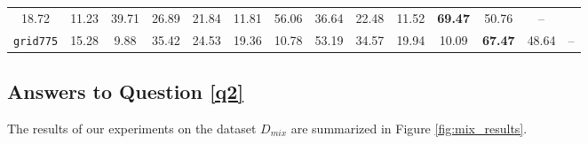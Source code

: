 \begin{table}[t]
\begin{adjustwidth}{-.5in}{-.5in}
\begin{center}
\begin{tabular}{|c|cccc|cccc|cccc|c|}
                18.72 & 11.23 & 39.71 & 26.89 &  %
                21.84 & 11.81 & 56.06 & 36.64 &  %
                22.48 & 11.52 & \textbf{69.47} & 50.76 &   %
                -- \\
                \texttt{grid775} &
                15.28 & 9.88 & 35.42 & 24.53 &  %
                19.36 & 10.78 & 53.19 & 34.57 &  %
                19.94 & 10.09 & \textbf{67.47} & 48.64 &   %
                -- \\
                \hline
            \end{tabular}
        \end{center}
    \end{adjustwidth}
    \vspace{-15pt}
\end{table}

\subsection{Answers to Question \ref{q2}}

The results of our experiments on the dataset $D_{mix}$ are summarized in Figure \ref{fig:mix_results}.  


